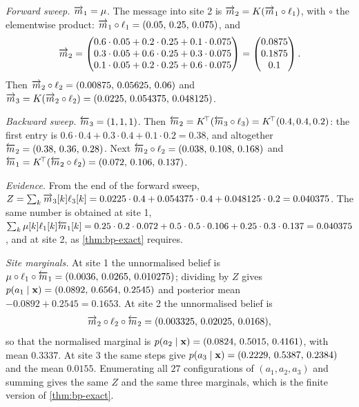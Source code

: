 \emph{Forward sweep.} $\overrightarrow{m}_1=\mu$. The message into site 2 is
$\overrightarrow{m}_2=K(\overrightarrow{m}_1\circ\ell_1)$, with $\circ$ the elementwise product:
$\overrightarrow{m}_1\circ\ell_1=(0.05,\,0.25,\,0.075)$, and
\[
  \overrightarrow{m}_2=\begin{pmatrix}0.6\cdot0.05+0.2\cdot0.25+0.1\cdot0.075\\
                         0.3\cdot0.05+0.6\cdot0.25+0.3\cdot0.075\\
                         0.1\cdot0.05+0.2\cdot0.25+0.6\cdot0.075\end{pmatrix}
        =\begin{pmatrix}0.0875\\0.1875\\0.1\end{pmatrix}.
\]
Then $\overrightarrow{m}_2\circ\ell_2=(0.00875,\,0.05625,\,0.06)$ and
$\overrightarrow{m}_3=K(\overrightarrow{m}_2\circ\ell_2)=(0.0225,\,0.054375,\,0.048125)$.

\emph{Backward sweep.} $\overleftarrow{m}_3=(1,1,1)$. Then
$\overleftarrow{m}_2=K^{\!\top}(\overleftarrow{m}_3\circ\ell_3)=K^{\!\top}(0.4,0.4,0.2)$: the first
entry is $0.6\cdot0.4+0.3\cdot0.4+0.1\cdot0.2=0.38$, and altogether
$\overleftarrow{m}_2=(0.38,\,0.36,\,0.28)$. Next $\overleftarrow{m}_2\circ\ell_2=(0.038,\,0.108,\,0.168)$ and
$\overleftarrow{m}_1=K^{\!\top}(\overleftarrow{m}_2\circ\ell_2)=(0.072,\,0.106,\,0.137)$.

\emph{Evidence.} From the end of the forward sweep,
$Z=\sum_k\overrightarrow{m}_3[k]\ell_3[k]=0.0225\cdot0.4+0.054375\cdot0.4+0.048125\cdot0.2=0.040375$.
The same number is obtained at site 1, $\sum_k\mu[k]\ell_1[k]\overleftarrow{m}_1[k]
=0.25\cdot0.2\cdot0.072+0.5\cdot0.5\cdot0.106+0.25\cdot0.3\cdot0.137=0.040375$, and at
site 2, as \cref{thm:bp-exact} requires.

\emph{Site marginals.} At site 1 the unnormalised belief is
$\mu\circ\ell_1\circ\overleftarrow{m}_1=(0.0036,\,0.0265,\,0.010275)$; dividing by $Z$ gives
$p(a_1\mid\mathbf{x})=(0.0892,\,0.6564,\,0.2545)$ and posterior mean
$-0.0892+0.2545=0.1653$. At site 2 the unnormalised belief is
\[
  \overrightarrow{m}_2\circ\ell_2\circ\overleftarrow{m}_2=(0.003325,\,0.02025,\,0.0168),
\]
so that the normalised marginal is $p(a_2\mid\mathbf{x})=(0.0824,\,0.5015,\,0.4161)$, with
mean $0.3337$. At site 3 the same steps give $p(a_3\mid\mathbf{x})=(0.2229,\,0.5387,\,0.2384)$
and the mean $0.0155$. Enumerating all $27$
configurations of $(a_1,a_2,a_3)$ and summing gives the same $Z$ and the same three
marginals, which is the finite version of \cref{thm:bp-exact}.

